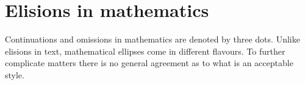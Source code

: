 
%

\section{Elisions in mathematics}

Continuations and omissions in mathematics are denoted by three dots. Unlike elisions in text, mathematical ellipses come in different flavours. To further complicate matters there is no general agreement as to what is an acceptable  style.


